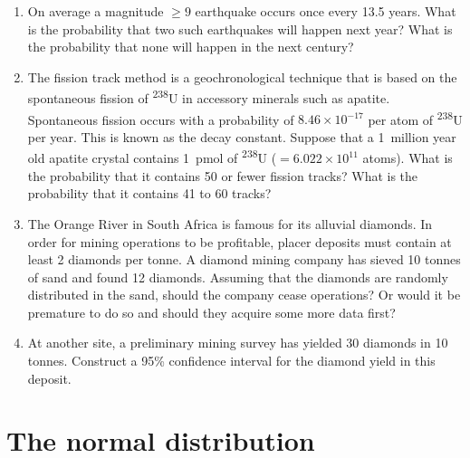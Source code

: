 \begin{enumerate}
  
\item On average a magnitude $\geq{9}$ earthquake occurs once every
  13.5 years. What is the probability that two such earthquakes will
  happen next year?  What is the probability that none will happen in
  the next century?

\item The fission track method is a geochronological technique that is
  based on the spontaneous fission of \textsuperscript{238}U in
  accessory minerals such as apatite. Spontaneous fission occurs with
  a probability of $8.46\times{10}^{-17}$ per atom of
  \textsuperscript{238}U per year. This is known as the decay
  constant. Suppose that a 1~million year old apatite crystal contains
  1~pmol of \textsuperscript{238}U ($=6.022\times{10}^{11}$
  atoms). What is the probability that it contains 50 or fewer fission
  tracks? What is the probability that it contains 41 to 60 tracks?
  
\item The Orange River in South Africa is famous for its alluvial
  diamonds. In order for mining operations to be profitable, placer
  deposits must contain at least 2 diamonds per tonne.  A diamond
  mining company has sieved 10 tonnes of sand and found 12
  diamonds. Assuming that the diamonds are randomly distributed in the
  sand, should the company cease operations? Or would it be premature
  to do so and should they acquire some more data first?

\item At another site, a preliminary mining survey has yielded 30
  diamonds in 10 tonnes. Construct a 95\% confidence interval for the
  diamond yield in this deposit.
  
\end{enumerate}

\section{The normal distribution}
\label{sec:ex-gauss}

